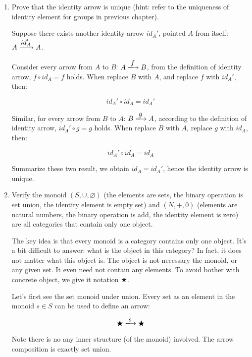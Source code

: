 \documentclass[UTF8]{article}
\begin{document}
\begin{enumerate}
\item {Prove that the identity arrow is unique (hint: refer to the uniqueness of identity element for groups in previous chapter).}

Suppose there exists another identity arrow $id_A'$, pointed $A$ from itself: $A \arrowto{id_A'} A$.

Consider every arrow from $A$ to $B$: $A \arrowto{f} B$, from the definition of identity arrow, $f \circ id_A = f$ holds. When replace $B$ with $A$, and replace $f$ with $id_A'$, then:

\[
id_A' \circ id_A = id_A'
\]

Similar, for every arrow from $B$ to $A$: $B \arrowto{g} A$, according to the definition of identity arrow, $id_A' \circ g = g$ holds. When replace $B$ with $A$, replace $g$ with $id_A$, then:

\[
id_A' \circ id_A = id_A
\]

Summarize these two result, we obtain $id_A = id_A'$, hence the identity arrow is unique.

\item {Verify the monoid $(S, \cup, \varnothing)$ (the elements are sets, the binary operation is set union, the identity element is empty set) and $(N, +, 0)$ (elements are natural numbers, the binary operation is add, the identity element is zero) are all categories that contain only one object.}

The key idea is that every monoid is a category contains only one object. It's a bit difficult to answer: what is the object in this category? In fact, it does not matter what this object is. The object is not necessary the monoid, or any given set. It even need not contain any elements. To avoid bother with concrete object, we give it notation $\bigstar$.

Let's first see the set monoid under union. Every set as an element in the monoid $s \in S$ can be used to define an arrow:

\[
\bigstar \arrowto{s} \bigstar
\]

Note there is no any inner structure (of the monoid) involved. The arrow composition is exactly set union.

\begin{center}
\end{center}


\end{enumerate}
\end{document}
